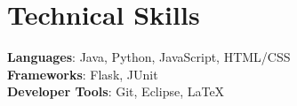 \documentclass[letterpaper,11pt]{article}
\begin{document}
\section{Technical Skills}
 \begin{itemize}[leftmargin=0.15in, label={}]
    \small{\item{
     \textbf{Languages}{: Java, Python, JavaScript, HTML/CSS} \\
     \textbf{Frameworks}{: Flask, JUnit} \\
     \textbf{Developer Tools}{: Git, Eclipse, LaTeX} \\
    }}
 \end{itemize}


\end{document}

